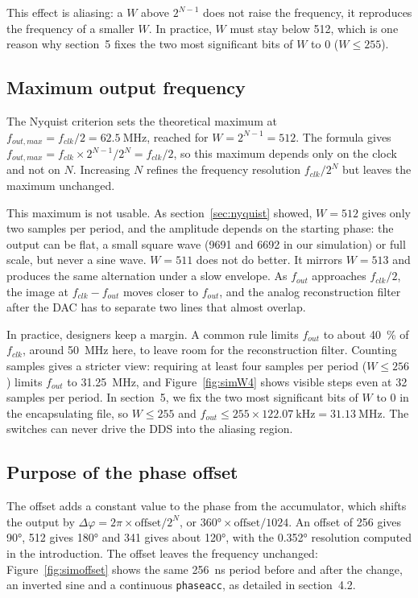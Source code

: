 \documentclass[11pt,a4paper]{article}
\renewcommand{\_}{\oldunderscore\allowbreak}
\begin{document}
This effect is aliasing: a $W$ above $2^{N-1}$ does not raise the frequency, it
reproduces the frequency of a smaller $W$. In practice, $W$ must stay below 512,
which is one reason why section~5 fixes the two most significant bits of $W$ to 0
($W \leq 255$).

\subsection{Maximum output frequency}
The Nyquist criterion sets the theoretical maximum at
$f_{out,max} = f_{clk}/2 = \SI{62.5}{\mega\hertz}$, reached for $W = 2^{N-1} = 512$.
The formula gives $f_{out,max} = f_{clk} \times 2^{N-1}/2^N = f_{clk}/2$, so this
maximum depends only on the clock and not on $N$. Increasing $N$ refines the
frequency resolution $f_{clk}/2^N$ but leaves the maximum unchanged.

This maximum is not usable. As section~\ref{sec:nyquist} showed, $W = 512$ gives
only two samples per period, and the amplitude depends on the starting phase: the
output can be flat, a small square wave (9691 and 6692 in our simulation) or full
scale, but never a sine wave. $W = 511$ does not do better. It mirrors $W = 513$ and
produces the same alternation under a slow envelope. As $f_{out}$ approaches
$f_{clk}/2$, the image at $f_{clk} - f_{out}$ moves closer to $f_{out}$, and the
analog reconstruction filter after the DAC has to separate two lines that almost
overlap.

In practice, designers keep a margin. A common rule limits $f_{out}$ to about
\SI{40}{\percent} of $f_{clk}$, around \SI{50}{\mega\hertz} here, to leave room for
the reconstruction filter. Counting samples gives a stricter view: requiring at
least four samples per period ($W \leq 256$) limits $f_{out}$ to
\SI{31.25}{\mega\hertz}, and Figure~\ref{fig:simW4} shows visible steps even at 32
samples per period. In section~5, we fix the two most significant bits of $W$ to 0
in the encapsulating file, so $W \leq 255$ and
$f_{out} \leq 255 \times \SI{122.07}{\kilo\hertz} = \SI{31.13}{\mega\hertz}$. The
switches can never drive the DDS into the aliasing region.

\subsection{Purpose of the phase offset}
The offset adds a constant value to the phase from the accumulator, which shifts
the output by $\Delta\varphi = 2\pi \times \mathrm{offset}/2^N$, or
$\ang{360} \times \mathrm{offset}/1024$. An offset of 256 gives \ang{90}, 512 gives
\ang{180} and 341 gives about \ang{120}, with the \ang{0.352} resolution computed in
the introduction. The offset leaves the frequency unchanged:
Figure~\ref{fig:simoffset} shows the same \SI{256}{\nano\second} period before and
after the change, an inverted sine and a continuous \texttt{phase\_acc}, as detailed
in section~4.2.
\end{document}
